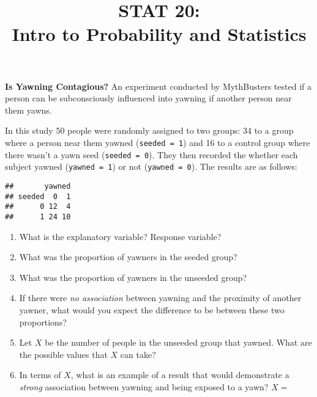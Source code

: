 \documentclass[10pt]{article}\usepackage[]{graphicx}\usepackage[]{color}
\title{STAT 20:\\Intro to Probability and Statistics}
\date{}
\makeatletter
\newenvironment{kframe}{%
 \def\at@end@of@kframe{}%
 \ifinner\ifhmode%
  \def\at@end@of@kframe{\end{minipage}}%
  \begin{minipage}{\columnwidth}%
 \fi\fi%
 \def\FrameCommand##1{\hskip\@totalleftmargin \hskip-\fboxsep
 \colorbox{shadecolor}{##1}\hskip-\fboxsep
     \hskip-\linewidth \hskip-\@totalleftmargin \hskip\columnwidth}%
 \MakeFramed {\advance\hsize-\width
   \@totalleftmargin\z@ \linewidth\hsize
   \@setminipage}}%
 {\par\unskip\endMakeFramed%
 \at@end@of@kframe}
\newenvironment{knitrout}{}{} %
\newcommand{\ans}{\vspace{0.5in}}
\makeatother
\begin{document}
\textbf{Is Yawning Contagious?} An experiment conducted by MythBusters tested if a person can be subconsciously influenced into yawning if another person near them yawns.

In this study 50 people were randomly assigned to two groups: 34 to a group where a person near them yawned (\texttt{seeded = 1}) and 16 to a control group where there wasn't a yawn seed (\texttt{seeded = 0}). They then recorded the whether each subject yawned (\texttt{yawned = 1}) or not (\texttt{yawned = 0}). The results are as follows:

\begin{knitrout}
\color{fgcolor}\begin{kframe}
\begin{verbatim}
##       yawned
## seeded  0  1
##      0 12  4
##      1 24 10
\end{verbatim}
\end{kframe}
\end{knitrout}


\begin{enumerate}
  \item What is the explanatory variable?  Response variable? 
  \ans
  \item What was the proportion of yawners in the seeded group?
  \ans
  \item What was the proportion of yawners in the unseeded group?
  \ans
  \item If there were \emph{no association} between yawning and the proximity of another yawner, what would you expect the difference to be between these two proportions?
  \ans
  \item Let $X$ be the number of people in the unseeded group that yawned.  What are the possible values that $X$ can take?
  \ans
  \item In terms of $X$, what is an example of a result that would demonstrate a \emph{strong} association between yawning and being exposed to a yawn?  $X = $
\end{enumerate}

\newpage
\end{document}
